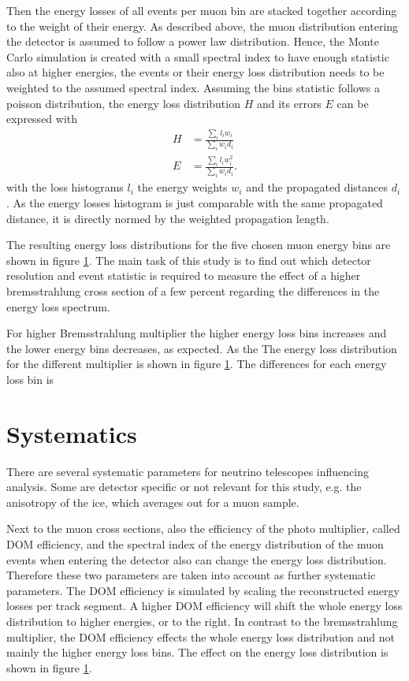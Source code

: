 Then the energy losses of all events per muon bin are stacked together according to the weight of their energy.
As described above, the muon distribution entering the detector is assumed to follow a power law distribution.
Hence, the Monte Carlo simulation is created with a small spectral index to have enough statistic also at higher energies, the events or their energy loss distribution needs to be weighted to the assumed spectral index.
Assuming the bins statistic follows a poisson distribution, the energy loss distribution $H$ and its errors $E$ can be expressed with
\begin{align}
    H &= \frac{\sum_i l_i w_i}{\sum_i w_i d_i} \\
    E &= \frac{\sum_i l_i w_i^2}{\sum_i w_i d_i}.
\end{align}
with the loss histograms $l_i$ the energy weights $w_i$ and the propagated distances $d_i$.
As the energy losses histogram is just comparable with the same propagated distance, it is directly normed by the weighted propagation length.

The resulting energy loss distributions for the five chosen muon energy bins are shown in figure \ref{}.
The main task of this study is to find out which detector resolution and event statistic is required to measure the effect of a higher bremsstrahlung cross section of a few percent regarding the differences in the energy loss spectrum.

For higher Bremsstrahlung multiplier the higher energy loss bins increases and the lower energy bins decreases, as expected.
As the 
The energy loss distribution for the different multiplier is shown in figure \ref{}.
The differences for each energy loss bin is 

\section{Systematics}

There are several systematic parameters for neutrino telescopes influencing analysis.
Some are detector specific or not relevant for this study, e.g. the anisotropy of the ice, which averages out for a muon sample.

Next to the muon cross sections, also the efficiency of the photo multiplier, called DOM efficiency, and the spectral index of the energy distribution of the muon events when entering the detector also can change the energy loss distribution.
Therefore these two parameters are taken into account as further systematic parameters.
The DOM efficiency is simulated by scaling the reconstructed energy losses per track segment.
A higher DOM efficiency will shift the whole energy loss distribution to higher energies, or to the right.
In contrast to the bremsstrahlung multiplier, the DOM efficiency effects the whole energy loss distribution and not mainly the higher energy loss bins.
The effect on the energy loss distribution is shown in figure \ref{}.

